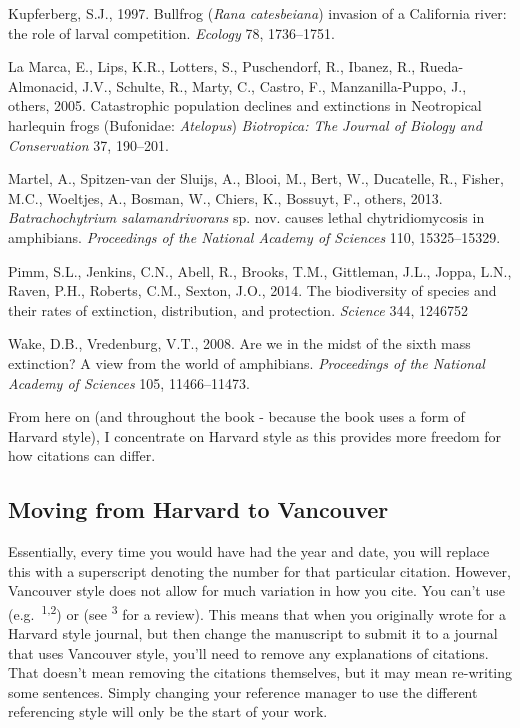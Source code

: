 \documentclass[
]{krantz}
\begin{document}
Kupferberg, S.J., 1997. Bullfrog (\emph{Rana catesbeiana}) invasion of a California river: the role of larval competition. \emph{Ecology} 78, 1736--1751.

La Marca, E., Lips, K.R., Lotters, S., Puschendorf, R., Ibanez, R., Rueda-Almonacid, J.V., Schulte, R., Marty, C., Castro, F., Manzanilla-Puppo, J., others, 2005. Catastrophic population declines and extinctions in Neotropical harlequin frogs (Bufonidae: \emph{Atelopus}) \emph{Biotropica: The Journal of Biology and Conservation} 37, 190--201.

Martel, A., Spitzen-van der Sluijs, A., Blooi, M., Bert, W., Ducatelle, R., Fisher, M.C., Woeltjes, A., Bosman, W., Chiers, K., Bossuyt, F., others, 2013. \emph{Batrachochytrium salamandrivorans} sp. nov. causes lethal chytridiomycosis in amphibians. \emph{Proceedings of the National Academy of Sciences} 110, 15325--15329.

Pimm, S.L., Jenkins, C.N., Abell, R., Brooks, T.M., Gittleman, J.L., Joppa, L.N., Raven, P.H., Roberts, C.M., Sexton, J.O., 2014. The biodiversity of species and their rates of extinction, distribution, and protection. \emph{Science} 344, 1246752

Wake, D.B., Vredenburg, V.T., 2008. Are we in the midst of the sixth mass extinction? A view from the world of amphibians. \emph{Proceedings of the National Academy of Sciences} 105, 11466--11473.

From here on (and throughout the book - because the book uses a form of Harvard style), I concentrate on Harvard style as this provides more freedom for how citations can differ.

\hypertarget{moving-from-harvard-to-vancouver}{%
\subsection{Moving from Harvard to Vancouver}\label{moving-from-harvard-to-vancouver}}

Essentially, every time you would have had the year and date, you will replace this with a superscript denoting the number for that particular citation. However, Vancouver style does not allow for much variation in how you cite. You can't use (e.g.~\textsuperscript{1,2}) or (see \textsuperscript{3} for a review). This means that when you originally wrote for a Harvard style journal, but then change the manuscript to submit it to a journal that uses Vancouver style, you'll need to remove any explanations of citations. That doesn't mean removing the citations themselves, but it may mean re-writing some sentences. Simply changing your reference manager to use the different referencing style will only be the start of your work.
\end{document}
